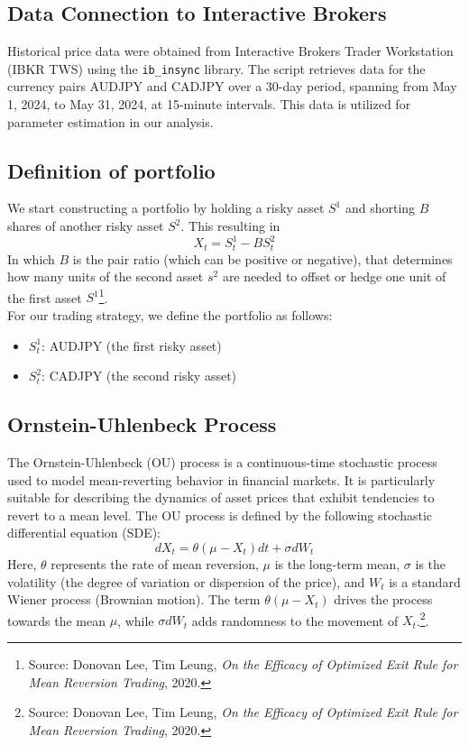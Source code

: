 \documentclass{article}
\begin{document}
\subsection*{Data Connection to Interactive Brokers}

Historical price data were obtained from Interactive Brokers Trader Workstation (IBKR TWS) using the \texttt{ib\_insync} library. The script retrieves data for the currency pairs AUDJPY and CADJPY over a 30-day period, spanning from May 1, 2024, to May 31, 2024, at 15-minute intervals. This data is utilized for parameter estimation in our analysis.


\subsection*{Definition of portfolio}
We start constructing a portfolio by holding a risky asset $S^1$ and shorting $B$ shares of another risky asset $S^2$. This resulting in
\begin{equation}
    X_t=S_t^1-BS_t^2
\end{equation}
In which $B$ is the pair ratio (which can be positive or negative), that determines how many units of the second asset $s^2$ are needed to offset or hedge one unit of the first asset $S^1$\footnote{Source: Donovan Lee, Tim Leung, \textit{On the Efficacy of Optimized Exit Rule for Mean Reversion Trading}, 2020.}.\\

For our trading strategy, we define the portfolio as follows:
\begin{itemize}
    \item $S_t^1$: AUDJPY (the first risky asset)
    \item $S_t^2$: CADJPY (the second risky asset)
\end{itemize}


\subsection*{Ornstein-Uhlenbeck Process}
The Ornstein-Uhlenbeck (OU) process is a continuous-time stochastic process used to model mean-reverting behavior in financial markets. It is particularly suitable for describing the dynamics of asset prices that exhibit tendencies to revert to a mean level. The OU process is defined by the following stochastic differential equation (SDE):
\begin{equation}
dX_t = \theta (\mu - X_t) dt + \sigma dW_t
\end{equation}
Here, \( \theta \) represents the rate of mean reversion, \( \mu \) is the long-term mean, \( \sigma \) is the volatility (the degree of variation or dispersion of the price), and \( W_t \) is a standard Wiener process (Brownian motion). The term \( \theta (\mu - X_t) \) drives the process towards the mean \( \mu \), while \( \sigma dW_t \) adds randomness to the movement of \( X_t \).\footnote{Source: Donovan Lee, Tim Leung, \textit{On the Efficacy of Optimized Exit Rule for Mean Reversion Trading}, 2020.}.
\end{document}

